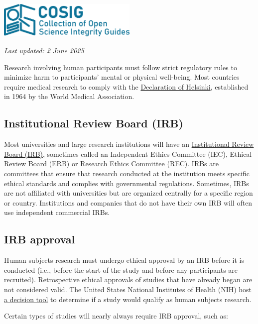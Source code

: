 \documentclass[letterpaper, 12pt]{article}
\begin{document}
\flushleft\includegraphics[width=0.5\textwidth]{img/home/241017_final_logo_mockup.png}

\textit{Last updated: 2 June 2025}

Research involving human participants must follow strict regulatory rules to minimize harm to participants' mental or physical well-being. Most countries require medical research to comply with the \href{https://www.wma.net/policies-post/wma-declaration-of-helsinki/}{Declaration of Helsinki}, established in 1964 by the World Medical Association.

\subsection*{Institutional Review Board (IRB)}

Most universities and large research institutions will have an \href{https://en.wikipedia.org/wiki/Institutional_review_board#Exceptions}{Institutional Review Board (IRB)}, sometimes called an Independent Ethics Committee (IEC), Ethical Review Board (ERB) or Research Ethics Committee (REC). IRBs are committees that ensure that research conducted at the institution meets specific ethical standards and complies with governmental regulations. Sometimes, IRBs are not affiliated with universities but are organized centrally for a specific region or country. Institutions and companies that do not have their own IRB will often use independent commercial IRBs.

\subsection*{IRB approval}

Human subjects research must undergo ethical approval by an IRB before it is conducted (i.e., before the start of the study and before any participants are recruited). Retrospective ethical approvals of studies that have already began are not considered valid. The United States National Institutes of Health (NIH) host \href{https://grants.nih.gov/policy-and-compliance/policy-topics/human-subjects/hs-decision}{a decision tool} to determine if a study would qualify as human subjects research.

Certain types of studies will nearly always require IRB approval, such as:
\end{document}
